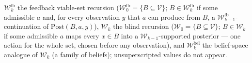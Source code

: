 


\(\mathcal{W}^{\mathrm{fb}}_{k}\) the feedback viable-set recursion
(\(\mathcal{W}^{\mathrm{fb}}_{0} = \{B \subseteq \mathcal{V}\}\);
\(B \in \mathcal{W}^{\mathrm{fb}}_{k}\) if some admissible \(a\) and, for
every observation \(y\) that \(a\) can produce from \(B\), a
\(\mathcal{W}^{\mathrm{fb}}_{k-1}\)-continuation of
\(\mathrm{Post}(B,a,y)\)), \(\mathcal{W}_{k}\) the blind recursion
(\(\mathcal{W}_{0} = \{B \subseteq \mathcal{V}\}\);
\(B \in \mathcal{W}_{k}\) if some admissible \(a\) maps every \(x \in B\)
into a \(\mathcal{W}_{k-1}\)-supported posterior — one action for the whole
set, chosen before any observation), and
\(\mathcal{W}^{\mathrm{bel}}_{k}\) the belief-space analogue of
\(\mathcal{W}_{k}\) (a family of beliefs); unsuperscripted values do not
appear.




